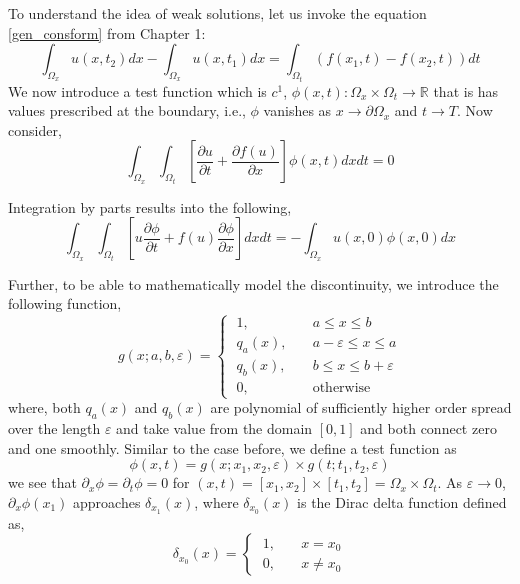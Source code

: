 \documentclass[11pt, a4paper]{report}
\begin{document}
To understand the idea of weak solutions, let us invoke the equation \eqref{gen_consform} from Chapter 1:
\begin{equation} \label{conseq}
    \int_{\Omega_{x}}u\left(x, t_{2}\right)dx - \int_{\Omega_{x}} u\left(x, t_{1}\right)dx = \int_{\Omega_{t}} (f\left(x_{1}, t\right) - f\left(x_{2}, t\right))dt
\end{equation}
We now introduce a test function which is $c^1$, $\phi(x,t): \Omega_x\times\Omega_t\rightarrow\mathbb{R}$ that is 
has values prescribed at the boundary, i.e., $\phi$ vanishes as $x\rightarrow{\partial \Omega_x}$ and $t\rightarrow T$.
Now consider,
\begin{equation*}
    \int_{\Omega_{x}}\int_{\Omega_{t}}\left[\frac{\partial u}{\partial t} + \frac{\partial f(u)}{\partial x}\right]\phi(x, t)dxdt = 0
\end{equation*}

Integration by parts results into the following,
\begin{equation} \label{weaksolneq1}
    \int_{\Omega_{x}}\int_{\Omega_{t}}\left[u\frac{\partial \phi}{\partial t} + f(u)\frac{\partial \phi}{\partial x}\right]dxdt = -\int_{\Omega_{x}}u(x, 0)\phi(x, 0)dx
\end{equation}

Further, to be able to mathematically model the discontinuity, we introduce the following function,
\begin{equation}
    g(x; a, b, \varepsilon) = \begin{cases}
    \; 1, & \quad a\leq x\leq b\\[-0.5em]
    \; q_a(x), & \quad a - \varepsilon\leq x \leq a\\[-0.5em]
    \; q_b(x), & \quad b\leq x\leq b + \varepsilon \\[-0.5em]
    \; 0, & \quad \text{otherwise}
    \end{cases}
\end{equation}
where, both $q_a(x)$ and $q_b(x)$ are polynomial of sufficiently higher order spread over the length $\varepsilon$ 
and take value from the domain $[0, 1]$ and both connect zero and one smoothly. Similar to the case before, we 
define a test function as
\begin{equation*}
    \phi(x, t) = g\left(x; x_{1}, x_{2}, \varepsilon\right) \times g\left(t; t_{1}, t_{2},\varepsilon\right)
\end{equation*}
we see that $\partial_x\phi = \partial_t\phi = 0$ for $(x, t)=[x_1, x_2]\times[t_1, t_2] = \Omega_x\times\Omega_t$.
As $\varepsilon\rightarrow 0$, $\partial_x\phi(x_1)$ approaches $\delta_{x_1}(x)$, where $\delta_{x_0}(x)$ is the 
Dirac delta function defined as,
\begin{equation}
    \delta_{x_0}(x) = \begin{cases}
    \; 1, & \quad x = x_0\\[-0.5em]
    \; 0, & \quad x \neq x_0
    \end{cases}
\end{equation}
\end{document}
